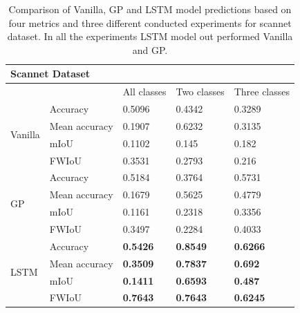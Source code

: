 	\begin{table}
		\centering
		\begin{tabular}{|l|l|l|l|l|} 
			\hline
			\multicolumn{5}{|l|}{\centering \textbf{Scannet Dataset}}                                                  \\ 
			\hline
			&               & All classes     & Two classes     & Three classes    \\ 
			\hline
			\multirow{4}{*}{Vanilla} & Accuracy      & 0.5096          & 0.4342          & 0.3289           \\ 
			\cline{2-5}
			& Mean accuracy & 0.1907          & 0.6232          & 0.3135           \\ 
			\cline{2-5}
			& mIoU          & 0.1102          & 0.145           & 0.182            \\ 
			\cline{2-5}
			& FWIoU         & 0.3531          & 0.2793          & 0.216            \\ 
			\hline
			\multirow{4}{*}{GP}      & Accuracy      & 0.5184          & 0.3764          & 0.5731           \\ 
			\cline{2-5}
			& Mean accuracy & 0.1679          & 0.5625          & 0.4779           \\ 
			\cline{2-5}
			& mIoU          & 0.1161          & 0.2318          & 0.3356           \\ 
			\cline{2-5}
			& FWIoU         & 0.3497          & 0.2284          & 0.4033           \\ 
			\hline
			\multirow{4}{*}{LSTM}    & Accuracy      & \textbf{0.5426} & \textbf{0.8549} & \textbf{0.6266}  \\ 
			\cline{2-5}
			& Mean accuracy & \textbf{0.3509} & \textbf{0.7837} & \textbf{0.692}   \\ 
			\cline{2-5}
			& mIoU          & \textbf{0.1411} & \textbf{0.6593} & \textbf{0.487}   \\ 
			\cline{2-5}
			& FWIoU         & \textbf{0.7643} & \textbf{0.7643} & \textbf{0.6245}  \\
			\hline
		\end{tabular}
		\caption{Comparison of Vanilla, GP and LSTM model predictions based on four metrics and three different conducted experiments for scannet dataset. In all the experiments LSTM model out performed Vanilla and GP.}
		\label{table:hype1}
	\end{table}
	


